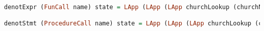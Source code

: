 \label{chapter:implemntation}

\begin{lstlisting}[language=Haskell]
denotExpr (FunCall name) state = LApp (LApp (LApp churchLookup (churchNum name)) state) state

denotStmt (ProcedureCall name) state = LApp (LApp (LApp churchLookup (churchNum name)) state) state
\end{lstlisting}

